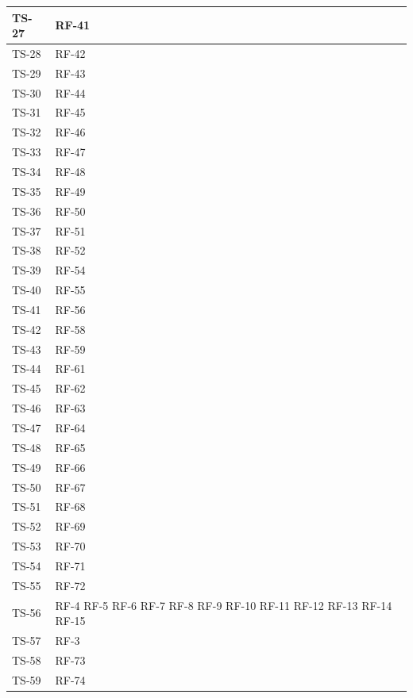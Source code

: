 \documentclass[8pt]{article}
\begin{document}
\begin{longtable}{|>{\centering}p{4cm}|>{\centering\arraybackslash}p{4cm}|}
    TS-27 & RF-41 \\
    \hline
    TS-28 & RF-42 \\
    \hline
    TS-29 & RF-43 \\
    \hline
    TS-30 & RF-44 \\
    \hline
    TS-31 & RF-45 \\
    \hline
    TS-32 & RF-46 \\
    \hline 
    TS-33 & RF-47 \\
    \hline
    TS-34 & RF-48 \\
    \hline
    TS-35 & RF-49 \\
    \hline
    TS-36 & RF-50 \\
    \hline
    TS-37 & RF-51 \\
    \hline
    TS-38 & RF-52 \\
    \hline
    TS-39 & RF-54 \\
    \hline
    TS-40 & RF-55 \\
    \hline
    TS-41 & RF-56 \\
    \hline
    TS-42 & RF-58 \\
    \hline
    TS-43 & RF-59 \\
    \hline
    TS-44 & RF-61 \\
    \hline
    TS-45 & RF-62 \\
    \hline
    TS-46 & RF-63 \\
    \hline
    TS-47 & RF-64 \\
    \hline
    TS-48 & RF-65 \\
    \hline
    TS-49 & RF-66 \\
    \hline
    TS-50 & RF-67 \\
    \hline
    TS-51 & RF-68 \\
    \hline
    TS-52 & RF-69 \\
    \hline
    TS-53 & RF-70 \\
    \hline
    TS-54 & RF-71 \\
    \hline
    TS-55 & RF-72 \\
    \hline
    TS-56 & RF-4 \newline
            RF-5 \newline
            RF-6 \newline
            RF-7 \newline
            RF-8 \newline
            RF-9 \newline
            RF-10 \newline
            RF-11 \newline
            RF-12 \newline
            RF-13 \newline
            RF-14 \newline
            RF-15 \\
    \hline
    TS-57 & RF-3 \\
    \hline
    TS-58 & RF-73 \\
    \hline
    TS-59 & RF-74 \\
    \hline
\end{longtable}
\clearpage
\end{document}

